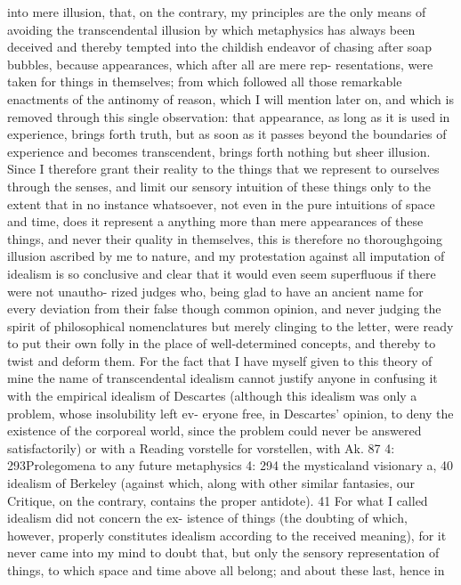 into mere illusion, that, on the contrary, my principles are the only means
of avoiding the transcendental illusion by which metaphysics has always
been deceived and thereby tempted into the childish endeavor of chasing
after soap bubbles, because appearances, which after all are mere rep-
resentations, were taken for things in themselves; from which followed
all those remarkable enactments of the antinomy of reason, which I will
mention later on, and which is removed through this single observation:
that appearance, as long as it is used in experience, brings forth truth, but
as soon as it passes beyond the boundaries of experience and becomes
transcendent, brings forth nothing but sheer illusion.
Since I therefore grant their reality to the things that we represent
to ourselves through the senses, and limit our sensory intuition of these
things only to the extent that in no instance whatsoever, not even in the
pure intuitions of space and time, does it represent a anything more than
mere appearances of these things, and never their quality in themselves,
this is therefore no thoroughgoing illusion ascribed by me to nature,
and my protestation against all imputation of idealism is so conclusive
and clear that it would even seem superﬂuous if there were not unautho-
rized judges who, being glad to have an ancient name for every deviation
from their false though common opinion, and never judging the spirit
of philosophical nomenclatures but merely clinging to the letter, were
ready to put their own folly in the place of well-determined concepts,
and thereby to twist and deform them. For the fact that I have myself
given to this theory of mine the name of transcendental idealism cannot
justify anyone in confusing it with the empirical idealism of Descartes
(although this idealism was only a problem, whose insolubility left ev-
eryone free, in Descartes’ opinion, to deny the existence of the corporeal
world, since the problem could never be answered satisfactorily) or with
a
Reading vorstelle for vorstellen, with Ak.
87
4: 293Prolegomena to any future metaphysics
4: 294
the mysticaland visionary a, 40 idealism of Berkeley (against which, along
with other similar fantasies, our Critique, on the contrary, contains the
proper antidote). 41 For what I called idealism did not concern the ex-
istence of things (the doubting of which, however, properly constitutes
idealism according to the received meaning), for it never came into my
mind to doubt that, but only the sensory representation of things, to
which space and time above all belong; and about these last, hence in

